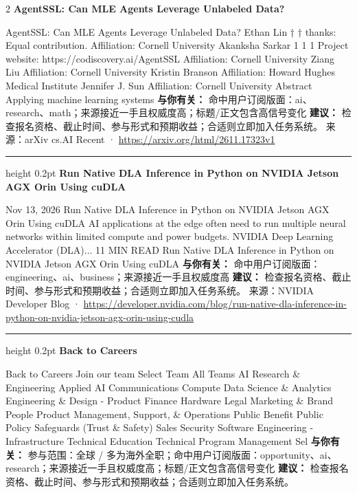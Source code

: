 \documentclass[10.5pt]{ctexart}
\begin{document}
\begin{multicols}{2}
{\large\bfseries AgentSSL: Can MLE Agents Leverage Unlabeled Data?}\par
AgentSSL: Can MLE Agents Leverage Unlabeled Data? Ethan Lin † † thanks: Equal contribution. Affiliation: Cornell University Akanksha Sarkar 1 1 1 Project website: https://codiscovery.ai/AgentSSL Affiliation: Cornell University Ziang Liu Affiliation: Cornell University Kristin Branson Affiliation: Howard Hughes Medical Institute Jennifer J. Sun Affiliation: Cornell University Abstract Applying machine learning systems
\textbf{与你有关：} 命中用户订阅版面：ai、research、math；来源接近一手且权威度高；标题/正文包含高信号变化
\textbf{建议：} 检查报名资格、截止时间、参与形式和预期收益；合适则立即加入任务系统。
{\footnotesize\color{ormuted} 来源：arXiv cs.AI Recent · \url{https://arxiv.org/html/2611.17323v1}}
\vspace{2mm}
\hrule height 0.2pt
\vspace{2mm}
{\large\bfseries Run Native DLA Inference in Python on NVIDIA Jetson AGX Orin Using cuDLA}\par
Nov 13, 2026 Run Native DLA Inference in Python on NVIDIA Jetson AGX Orin Using cuDLA AI applications at the edge often need to run multiple neural networks within limited compute and power budgets. NVIDIA Deep Learning Accelerator (DLA)... 11 MIN READ Run Native DLA Inference in Python on NVIDIA Jetson AGX Orin Using cuDLA
\textbf{与你有关：} 命中用户订阅版面：engineering、ai、business；来源接近一手且权威度高
\textbf{建议：} 检查报名资格、截止时间、参与形式和预期收益；合适则立即加入任务系统。
{\footnotesize\color{ormuted} 来源：NVIDIA Developer Blog · \url{https://developer.nvidia.com/blog/run-native-dla-inference-in-python-on-nvidia-jetson-agx-orin-using-cudla}}
\vspace{2mm}
\hrule height 0.2pt
\vspace{2mm}
{\large\bfseries Back to Careers}\par
Back to Careers Join our team Select Team All Teams AI Research \& Engineering Applied AI Communications Compute Data Science \& Analytics Engineering \& Design - Product Finance Hardware Legal Marketing \& Brand People Product Management, Support, \& Operations Public Benefit Public Policy Safeguards (Trust \& Safety) Sales Security Software Engineering - Infrastructure Technical Education Technical Program Management Sel
\textbf{与你有关：} 参与范围：全球 / 多为海外全职；命中用户订阅版面：opportunity、ai、research；来源接近一手且权威度高；标题/正文包含高信号变化
\textbf{建议：} 检查报名资格、截止时间、参与形式和预期收益；合适则立即加入任务系统。

\end{multicols}
\end{document}

